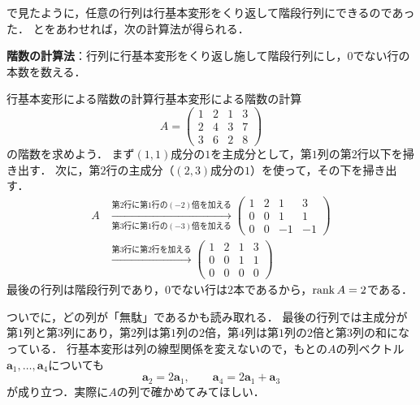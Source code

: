 で見たように，任意の行列は行基本変形をくり返して階段行列にできるのであった．
とをあわせれば，次の計算法が得られる．

\begin{tcolorbox}[colback=white, colframe=black, boxrule=0.5pt, arc=0pt, left=2mm, right=2mm, top=1mm, bottom=1mm]
  \textbf{階数の計算法}：行列に行基本変形をくり返し施して階段行列にし，$0$でない行の本数を数える．
\end{tcolorbox}

\begin{example}{行基本変形による階数の計算}{行基本変形による階数の計算}
  \[
    A = \begin{pmatrix}
      1 & 2 & 1 & 3 \\
      2 & 4 & 3 & 7 \\
      3 & 6 & 2 & 8
    \end{pmatrix}
  \]
  の階数を求めよう．
  まず$(1, 1)$成分の$1$を主成分として，第$1$列の第$2$行以下を掃き出す．
  次に，第$2$行の主成分（$(2, 3)$成分の$1$）を使って，その下を掃き出す．
  \begin{align*}
    A
    &\xrightarrow[\text{第$3$行に第$1$行の$(-3)$倍を加える}]{\text{第$2$行に第$1$行の$(-2)$倍を加える}}
    \begin{pmatrix}
      1 & 2 & 1 & 3 \\
      0 & 0 & 1 & 1 \\
      0 & 0 & -1 & -1
    \end{pmatrix} \\
    &\xrightarrow{\text{第$3$行に第$2$行を加える}}
    \begin{pmatrix}
      1 & 2 & 1 & 3 \\
      0 & 0 & 1 & 1 \\
      0 & 0 & 0 & 0
    \end{pmatrix}
  \end{align*}
  最後の行列は階段行列であり，$0$でない行は$2$本であるから，$\operatorname{rank} A = 2$である．

  ついでに，どの列が「無駄」であるかも読み取れる．
  最後の行列では主成分が第$1$列と第$3$列にあり，第$2$列は第$1$列の$2$倍，第$4$列は第$1$列の$2$倍と第$3$列の和になっている．
  行基本変形は列の線型関係を変えないので，もとの$A$の列ベクトル$\bm{a}_1, \dots, \bm{a}_4$についても
  \[
    \bm{a}_2 = 2\bm{a}_1, \qquad \bm{a}_4 = 2\bm{a}_1 + \bm{a}_3
  \]
  が成り立つ．実際に$A$の列で確かめてみてほしい．
\end{example}

